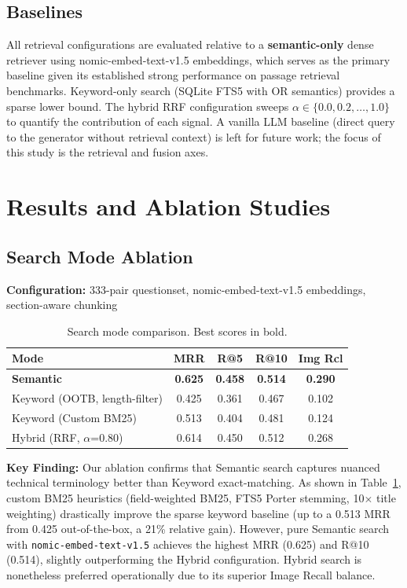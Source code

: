 \documentclass[11pt,a4paper]{article}
\begin{document}
\subsection{Baselines}

All retrieval configurations are evaluated relative to a \textbf{semantic-only} dense retriever using nomic-embed-text-v1.5 embeddings, which serves as the primary baseline given its established strong performance on passage retrieval benchmarks. Keyword-only search (SQLite FTS5 with OR semantics) provides a sparse lower bound. The hybrid RRF configuration sweeps $\alpha \in \{0.0, 0.2, \ldots, 1.0\}$ to quantify the contribution of each signal. A vanilla LLM baseline (direct query to the generator without retrieval context) is left for future work; the focus of this study is the retrieval and fusion axes.



\section{Results and Ablation Studies}

\subsection{Search Mode Ablation}

\textbf{Configuration:} 333-pair questionset, nomic-embed-text-v1.5 embeddings, section-aware chunking

\begin{table}[h]
\caption{Search mode comparison. Best scores in bold.}
\label{tab:search-mode}
\centering
\begin{tabular}{lcccc}
\toprule
\textbf{Mode} & \textbf{MRR} & \textbf{R@5} & \textbf{R@10} & \textbf{Img Rcl} \\
\midrule
\textbf{Semantic} & \textbf{0.625} & \textbf{0.458} & \textbf{0.514} & \textbf{0.290} \\
Keyword (OOTB, length-filter) & 0.425 & 0.361 & 0.467 & 0.102 \\
Keyword (Custom BM25) & 0.513 & 0.404 & 0.481 & 0.124 \\
Hybrid (RRF, $\alpha$=0.80) & 0.614 & 0.450 & 0.512 & 0.268 \\
\bottomrule
\end{tabular}

\end{table}

\textbf{Key Finding:} Our ablation confirms that Semantic search captures nuanced technical terminology better than Keyword exact-matching. As shown in Table~\ref{tab:search-mode}, custom BM25 heuristics (field-weighted BM25, FTS5 Porter stemming, 10$\times$ title weighting) drastically improve the sparse keyword baseline (up to a 0.513 MRR from 0.425 out-of-the-box, a 21\% relative gain). However, pure Semantic search with \texttt{nomic-embed-text-v1.5} achieves the highest MRR (0.625) and R@10 (0.514), slightly outperforming the Hybrid configuration. Hybrid search is nonetheless preferred operationally due to its superior Image Recall balance.
\end{document}
